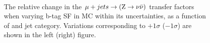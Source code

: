 \begin{figure}[!h]
  \centering
   ~~
  \\

  \caption{\label{fig:tfSyst_bsf_muToZinv} The relative change in the
  $\mu + jets \rightarrow ({\text Z} \rightarrow \nu\bar{\nu})$ transfer
  factors when varying b-tag SF in MC within its uncertainties, as a function of \scalht and jet category. 
  Variations corresponding to $+1\sigma$ ($-1\sigma$) are shown in the left (right) figure. 
  }
\end{figure}

